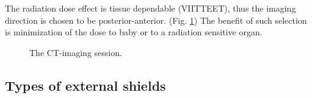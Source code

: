 \documentclass[fleqn,10pt]{SelfArx} %
\begin{document}

The radiation dose effect is tissue dependable (VIITTEET), thus the imaging direction is chosen to be posterior-anterior. (Fig. \ref{fig:KuvausSuunta}) The benefit of such selection is minimization of the dose to baby or to a radiation sensitive organ.


\begin{figure}[ht]\centering
\caption{The CT-imaging session.}
\label{fig:KuvausSuunta}
\end{figure}






\subsection{Types of external shields}
\end{document}
